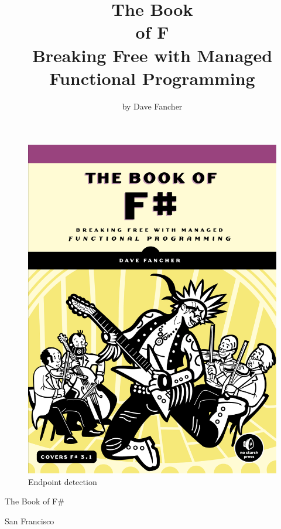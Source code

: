\documentclass{book}
\begin{document}
\begin {figure}[H]
  \centering
  \includegraphics[width=\paperwidth,height=\paperheight]{../pic/cover.png}
  \caption{Endpoint detection}
\end {figure}

The Book of F\#
\title{The Book\\of F\\Breaking Free with Managed \\Functional Programming}
\author{by Dave Fancher}
\maketitle


San Francisco
\end{document}
